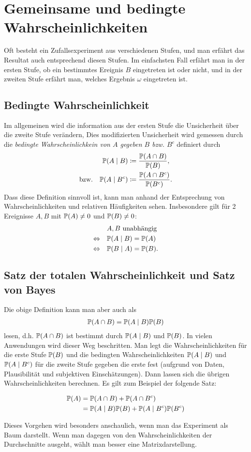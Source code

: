 \chapter{Gemeinsame und bedingte Wahrscheinlichkeiten}
\label{kap5}
Oft besteht ein Zufallsexperiment aus verschiedenen Stufen, und man erfährt das Resultat auch entsprechend diesen Stufen. Im einfachsten Fall erfährt man in der ersten Stufe, ob ein bestimmtes Ereignis $B$ eingetreten ist oder nicht, und in der zweiten Stufe erfährt man, welches Ergebnis $\omega$ eingetreten ist.
\section{Bedingte Wahrscheinlichkeit}
Im allgemeinen wird die information aus der ersten Stufe die Unsicherheit über die zweite Stufe verändern, Dies modifizierten Unsicherheit wird gemessen durch die \emph{bedingte Wahrscheinlichkein von $A$ gegeben $B$ bzw. $B^c$} definiert durch
\begin{align*}
	&&\mathbb P(A\mid B)&\coloneqq \frac{\mathbb P(A\cap B)}{\mathbb P(B)},\\
	\text{bzw.}&&
	\mathbb P(A\mid B^c)&\coloneqq \frac{\mathbb P(A\cap B^c)}{\mathbb P(B^c)}.
\end{align*}
Dass diese Definition sinnvoll ist, kann man anhand der Entsprechung von Wahrscheinlichkeiten und relativen Häufigkeiten sehen. Insbesondere gilt für 2 Ereignisse $A,B$ mit $\mathbb P(A)\neq 0$ und $\mathbb P(B)\neq 0$:
\begin{align*}
	&A,B \text{ unabhängig}\\
	\Leftrightarrow\quad& \mathbb P(A\mid B)= \mathbb P(A)\\
	\Leftrightarrow\quad& \mathbb P(B\mid A)=\mathbb P(B).
\end{align*}
\section{Satz der totalen Wahrscheinlichkeit und Satz von Bayes}
Die obige Definition kann man aber auch als 
\begin{gather*}
	\mathbb P(A\cap B)=\mathbb P(A\mid B)\mathbb P(B)
\end{gather*}
lesen, d.h. \mbox{$\mathbb P(A\cap B)$} ist bestimmt durch \mbox{$\mathbb P(A\mid B)$} und $\mathbb P(B)$. In vielen Anwendungen wird dieser Weg beschritten. Man legt die Wahrscheinlichkeiten für die erste Stufe $\mathbb P(B)$ und die bedingten Wahrscheinlichkeiten \mbox{$\mathbb P(A\mid B)$} und \mbox{$\mathbb P(A\mid B^{c})$} für die zweite Stufe gegeben die erste fest (aufgrund von Daten, Plausibilität und subjektiven Einschätzungen). Dann lassen sich die übrigen Wahrscheinlichkeiten berechnen. Es gilt zum Beispiel der folgende Satz:
\begin{satz}
	\begin{align*}
		\mathbb P(A)&=\mathbb P(A\cap B)+ \mathbb P(A\cap B^c)\\
		&= \mathbb P(A\mid B)\mathbb P(B)+\mathbb P(A\mid B^{c})\mathbb P(B^c)
	\end{align*}
\end{satz}
Dieses Vorgehen wird besonders anschaulich, wenn man das Experiment als Baum darstellt. Wenn man dagegen von den Wahrscheinlichkeiten der Durchschnitte ausgeht, wählt man besser eine Matrixdarstellung.


